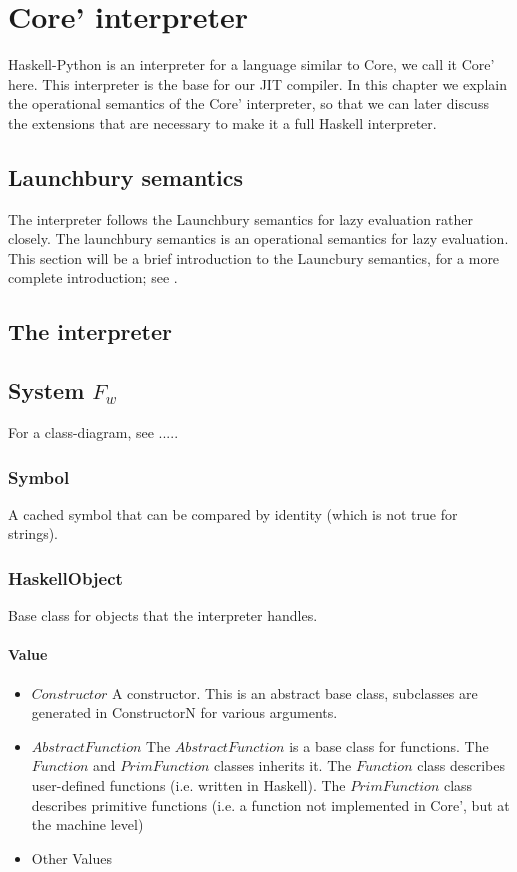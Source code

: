 
\chapter{Core' interpreter}

Haskell-Python is an interpreter for a language similar to Core, we call it Core' here.
This interpreter is the base for our JIT compiler. In this chapter we explain the 
operational semantics of the Core' interpreter, so that we can later discuss the 
extensions that are necessary to make it a full Haskell interpreter.

\section*{Launchbury semantics}

The interpreter follows the Launchbury semantics for lazy evaluation rather closely.
The launchbury semantics is an operational semantics for lazy evaluation. This section
will be a brief introduction to the Launcbury semantics, for a more complete introduction;
see \cite{launchbury1993natural}. 

\section*{The interpreter}


\section*{System $F_w$}

For a class-diagram, see .....

\subsection*{Symbol}

A cached symbol that can be compared by identity (which is not true for strings).

\subsection*{HaskellObject}

Base class for objects that the interpreter handles.

\subsubsection*{Value}

\begin{itemize}
\item{$Constructor$} A constructor. This is an abstract base class, subclasses are 
generated in ConstructorN for various arguments.
\item{$AbstractFunction$} The $AbstractFunction$ is a base class for functions. The 
$Function$ and $PrimFunction$ classes inherits it. The $Function$ class describes
user-defined functions (i.e. written in Haskell). The $PrimFunction$ class describes
primitive functions (i.e. a function not implemented in Core', but at the machine level)
\item{Other Values}
\end{itemize}

